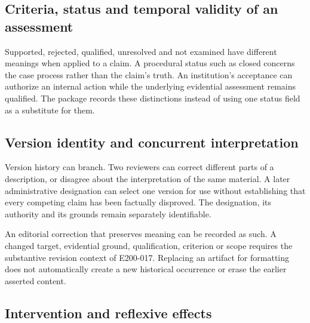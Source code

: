 \documentclass[11pt,a4paper]{article}
\begin{document}
\subsection{Criteria, status and temporal validity of an assessment}

Supported, rejected, qualified, unresolved and not examined have different meanings when applied to a claim. A procedural status such as closed concerns the case process rather than the claim's truth. An institution's acceptance can authorize an internal action while the underlying evidential assessment remains qualified. The package records these distinctions instead of using one status field as a substitute for them.

\subsection{Version identity and concurrent interpretation}

Version history can branch. Two reviewers can correct different parts of a description, or disagree about the interpretation of the same material. A later administrative designation can select one version for use without establishing that every competing claim has been factually disproved. The designation, its authority and its grounds remain separately identifiable.

An editorial correction that preserves meaning can be recorded as such. A changed target, evidential ground, qualification, criterion or scope requires the substantive revision context of E200-017. Replacing an artifact for formatting does not automatically create a new historical occurrence or erase the earlier asserted content.

\subsection{Intervention and reflexive effects}
\end{document}
